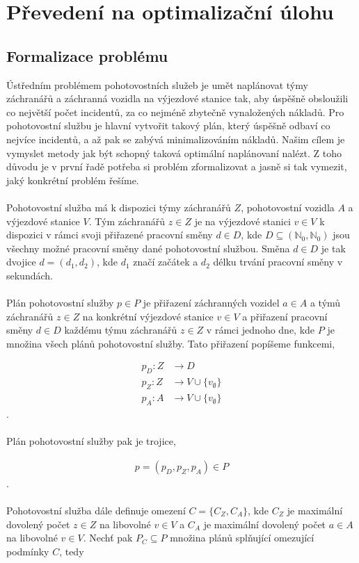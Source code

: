 \chapter{Převedení na optimalizační úlohu}

\section{Formalizace problému}

Ústředním problémem pohotovostních služeb je umět naplánovat týmy záchranářů a záchranná vozidla na výjezdové stanice tak, aby úspěšně obsloužili co největší počet incidentů,
za co nejméně zbytečně vynaložených nákladů.
Pro pohotovostní službu je hlavní vytvořit takový plán, který úspěšně odbaví co nejvíce incidentů, a až pak se zabývá minimalizováním nákladů.
Našim cílem je vymyslet metody jak být schopný taková optimální naplánovaní nalézt.
Z toho důvodu je v první řadě potřeba si problém zformalizovat a jasně si tak vymezit, jaký konkrétní problém řešíme.
\\
\\
Pohotovostní služba má k dispozici týmy záchranářů $Z$, pohotovostní vozidla $A$ a výjezdové stanice $V$.
Tým záchranářů $z \in Z$ je na výjezdové stanici $v \in V$ k dispozici v rámci svoji přiřazené pracovní směny $d \in D$,
kde $D \subseteq (\mathbb{N}_0, \mathbb{N}_0)$ jsou všechny možné pracovní směny dané pohotovostní službou.
Směna $d \in D$ je tak dvojice $d = (d_1, d_2)$, kde $d_1$ značí začátek a $d_2$ délku trvání pracovní směny v sekundách.
\\
\\
Plán pohotovostní služby $p \in P$ je přiřazení záchranných vozidel $a \in A$ a týmů záchranářů $z \in Z$ na konkrétní výjezdové stanice $v \in V$
a přiřazení pracovní směny $d \in D$ každému týmu záchranářů $z \in Z$ v rámci jednoho dne, kde $P$ je množina všech plánů pohotovostní služby.
Tato přiřazení popíšeme funkcemi, 

\begin{align}
  p_D \colon Z &\rightarrow D \\
  p_Z \colon Z &\rightarrow V \cup \{ v_{\emptyset} \} \\
  p_A \colon A &\rightarrow V \cup \{ v_{\emptyset} \}
\end{align}
.
\\
\\
Plán pohotovostní služby pak je trojice,

\begin{align}
  p = (p_D, p_Z, p_A) \in P
\end{align}
.
\\
\\
Pohotovostní služba dále definuje omezení $C = \{ C_Z, C_A \}$, kde $C_Z$ je maximální dovolený počet $z \in Z$ na libovolné $v \in V$
a $C_A$ je maximální dovolený počet $a \in A$ na libovolné $v \in V$.
Nechť pak $P_C \subseteq P$ množina plánů splňující omezující podmínky $C$, tedy

